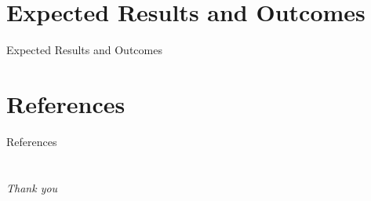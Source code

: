 \documentclass[xcolor=dvipsnames, compress]{beamer}
\begin{document}
\section{Expected Results and Outcomes}
\begin{frame}{Expected Results and Outcomes}

\end{frame}


\section*{References}
\begin{frame}[allowframebreaks]{References}

\printbibliography[heading=none]

\end{frame}


\section{}
\begin{frame}[c]
\begin{center}

\textcolor{blue!70}{\textrm{\Huge\textit{Thank you}}}
\end{center}
\end{frame}
\end{document}
